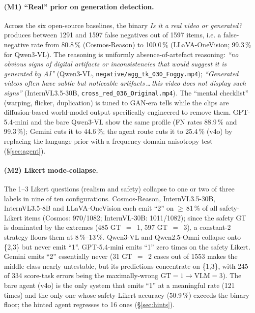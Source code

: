 \documentclass[11pt,a4paper]{article}
\providecommand{\num}[1]{#1}
\newcommand{\pct}[1]{#1\,\%}
\newcommand{\code}[1]{\texttt{#1}}
\begin{document}
\paragraph{(M1) ``Real'' prior on generation detection.} Across the six
open-source baselines, the binary \emph{Is it a real video or
generated?} produces between \num{1291} and \num{1597} false negatives
out of \num{1597} items, i.e. a false-negative rate from \pct{80.8}
(Cosmos-Reason) to \pct{100.0} (LLaVA-OneVision; \pct{99.3} for
Qwen3-VL). The reasoning is uniformly absence-of-artefact reasoning:
\emph{``no obvious signs of digital artifacts or inconsistencies that
would suggest it is generated by AI''} (Qwen3-VL,
\code{negative/agg\_tk\_030\_Foggy.mp4}); \emph{``Generated videos
often have subtle but noticeable artifacts\,\dots\,this video does not
display such signs''} (InternVL3.5-30B,
\code{cross\_red\_036\_Original.mp4}). The ``mental checklist''
(warping, flicker, duplication) is tuned to GAN-era tells while the
clips are diffusion-based world-model output specifically engineered
to remove them. GPT-5.4-mini and the bare Qwen3-VL show the same
profile (FN rates \pct{88.9} and \pct{99.3}); Gemini cuts it to
\pct{44.6}; the agent route cuts it to \pct{25.4} (v4o) by replacing
the language prior with a frequency-domain anisotropy test
(\S\ref{sec:agent}).

\paragraph{(M2) Likert mode-collapse.} The 1--3 Likert questions
(realism and safety) collapse to one or two of three labels in nine of
ten configurations. Cosmos-Reason, InternVL3.5-30B, InternVL3.5-8B and
LLaVA-OneVision each emit ``2'' on $\geq$\,\pct{81} of all safety-Likert
items (Cosmos: 970/1082; InternVL-30B: 1011/1082); since the safety GT
is dominated by the extremes (485 GT~$=$~1, 597 GT~$=$~3), a constant-2
strategy floors them at \pct{8}--\pct{13}. Qwen3-VL and Qwen2.5-Omni
collapse onto \{2,3\} but never emit ``1''. GPT-5.4-mini emits ``1'' zero
times on the safety Likert. Gemini emits ``2'' essentially never (31
GT~$=$~2 cases out of 1553 makes the middle class nearly untestable, but
its predictions concentrate on \{1,3\}, with 245 of 334 score-task errors
being the maximally-wrong $\text{GT}=1\to\text{VLM}=3$). The bare agent
(v4o) is the only system that emits ``1'' at a meaningful rate (121
times) and the only one whose safety-Likert accuracy
(\pct{50.9}) exceeds the binary floor; the hinted agent regresses to 16
ones (\S\ref{sec:hints}).
\end{document}
